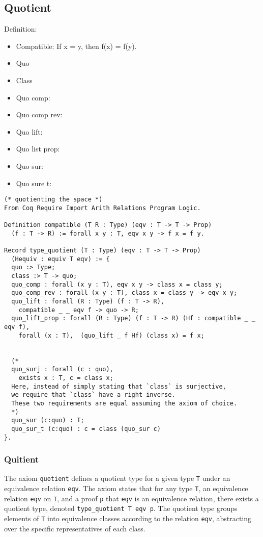\documentclass[a4paper,10pt]{article} %
\begin{document}
\subsection{Quotient}
Definition:
\begin{itemize}
    \item Compatible: If x = y, then f(x) = f(y).
    \item Quo
    \item Class
    \item Quo comp: 
    \item Quo comp rev: 
    \item Quo lift:
    \item Quo list prop:
    \item Quo sur:
    \item Quo sure t:
\end{itemize}
\begin{lstlisting}
(* quotienting the space *)
From Coq Require Import Arith Relations Program Logic.

Definition compatible (T R : Type) (eqv : T -> T -> Prop)
  (f : T -> R) := forall x y : T, eqv x y -> f x = f y.

Record type_quotient (T : Type) (eqv : T -> T -> Prop)
  (Hequiv : equiv T eqv) := {
  quo :> Type;
  class :> T -> quo;
  quo_comp : forall (x y : T), eqv x y -> class x = class y;
  quo_comp_rev : forall (x y : T), class x = class y -> eqv x y;
  quo_lift : forall (R : Type) (f : T -> R),
    compatible _ _ eqv f -> quo -> R;
  quo_lift_prop : forall (R : Type) (f : T -> R) (Hf : compatible _ _ eqv f),
    forall (x : T),  (quo_lift _ f Hf) (class x) = f x;


  (* 
  quo_surj : forall (c : quo), 
    exists x : T, c = class x; 
  Here, instead of simply stating that `class` is surjective, 
  we require that `class` have a right inverse.
  These two requirements are equal assuming the axiom of choice.
  *)
  quo_sur (c:quo) : T;
  quo_sur_t (c:quo) : c = class (quo_sur c)
}.
\end{lstlisting}

\subsubsection{Quitient}
The axiom \texttt{quotient} defines a quotient type for a given type \texttt{T} under an equivalence relation \texttt{eqv}. The axiom states that for any type \texttt{T}, an equivalence relation \texttt{eqv} on \texttt{T}, and a proof \texttt{p} that \texttt{eqv} is an equivalence relation, there exists a quotient type, denoted \texttt{type\_quotient T eqv p}. The quotient type groups elements of \texttt{T} into equivalence classes according to the relation \texttt{eqv}, abstracting over the specific representatives of each class.
\end{document}
